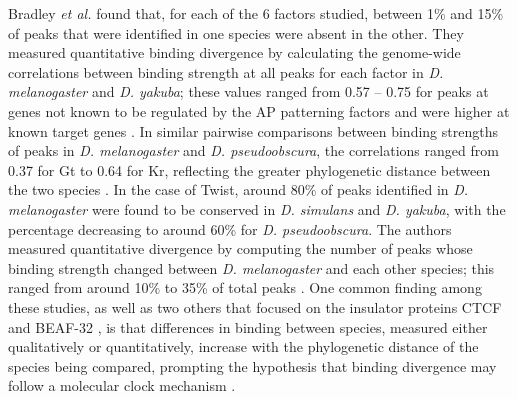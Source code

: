 Bradley \emph{et al.} found that, for each of the 6 factors studied, between 1\% and 15\% of peaks that were identified in one species were absent in the other. They measured quantitative binding divergence by calculating the genome-wide correlations between binding strength at all peaks for each factor in \emph{D. melanogaster} and \emph{D. yakuba}; these values ranged from 0.57 – 0.75 for peaks at genes not known to be regulated by the AP patterning factors and were higher at known target genes \citep{bradley_binding_2010}. In similar pairwise comparisons between binding strengths of peaks in \emph{D. melanogaster} and \emph{D. pseudoobscura}, the correlations ranged from 0.37 for Gt to 0.64 for Kr, reflecting the greater phylogenetic distance between the two species \citep{paris_extensive_2013}. In the case of Twist, around 80\% of peaks identified in \emph{D. melanogaster} were found to be conserved in \emph{D. simulans} and \emph{D. yakuba}, with the percentage decreasing to around 60\% for \emph{D. pseudoobscura}. The authors measured quantitative divergence by computing the number of peaks whose binding strength changed between \emph{D. melanogaster} and each other species; this ranged from around 10\% to 35\% of total peaks \citep{he_high_2011}. One common finding among these studies, as well as two others that focused on the insulator proteins CTCF and BEAF-32 \citep{ni_adaptive_2012,yang_beaf-32_2012}, is that differences in binding between species, measured either qualitatively or quantitatively, increase with the phylogenetic distance of the species being compared, prompting the hypothesis that binding divergence may follow a molecular clock mechanism \citep{he_high_2011}.

